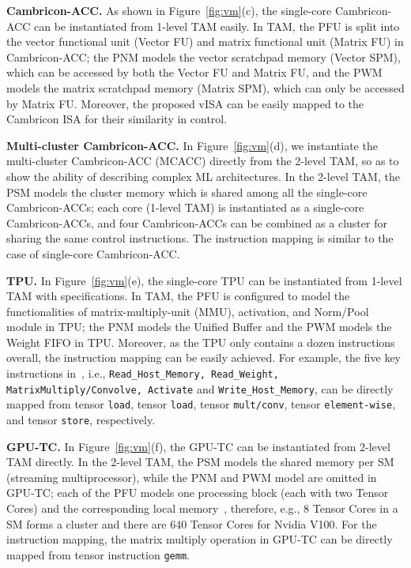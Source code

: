 \textbf{Cambricon-ACC.} As shown in Figure~\ref{fig:vm}(c), the
single-core Cambricon-ACC can be instantiated from 1-level TAM easily. In TAM,
the PFU is split into the vector functional unit (Vector FU) and matrix
functional unit (Matrix FU) in Cambricon-ACC; the PNM models the vector
scratchpad memory (Vector SPM), which can be accessed by both the Vector FU and
Matrix FU, and the PWM models the matrix scratchpad memory (Matrix SPM), which
can only be accessed by Matrix FU. Moreover, the proposed vISA can be
easily mapped to the Cambricon ISA for their similarity in control.

\textbf{Multi-cluster Cambricon-ACC.}
In Figure~\ref{fig:vm}(d), we instantiate the multi-cluster Cambricon-ACC (MCACC)
directly from the 2-level TAM, so as to show the ability of describing complex
ML architectures. In the 2-level TAM, the PSM models the cluster memory which is
shared among all the single-core Cambricon-ACCs; each core (1-level TAM) is
instantiated as a single-core Cambricon-ACCs, and four Cambricon-ACCs can be
combined as a cluster for sharing the same control instructions. The
instruction mapping is similar to the case of single-core Cambricon-ACC.

\textbf{TPU.} In Figure~\ref{fig:vm}(e), the single-core TPU
can be instantiated from 1-level TAM with specifications. In TAM, the PFU
is configured to model the functionalities of matrix-multiply-unit (MMU), activation, and
Norm/Pool module in TPU; the PNM models the Unified Buffer and the PWM models
the Weight FIFO in TPU. Moreover, as the TPU only contains a dozen
instructions overall, the instruction mapping can be easily achieved. For
example, the five key instructions in~\cite{jouppi2017datacenter}, i.e., \texttt{Read\_Host\_Memory,
Read\_Weight, MatrixMultiply/Convolve, Activate} and \texttt{Write\_Host\_Memory},
can be directly mapped from tensor \texttt{load}, tensor \texttt{load}, tensor
\texttt{mult/conv}, tensor \texttt{element-wise}, and tensor \texttt{store}, respectively.

\textbf{GPU-TC.} In Figure~\ref{fig:vm}(f), the GPU-TC can be
instantiated from 2-level TAM directly. In the 2-level TAM, the PSM models the 
shared memory per SM (streaming multiprocessor), while the PNM and PWM model are omitted in GPU-TC; 
each of the PFU models one processing block (each with two Tensor Cores) and the corresponding local memory~\cite{V100}, 
therefore, e.g., 8 Tensor Cores in a SM forms a cluster and there are 640 Tensor Cores for Nvidia
V100. For the instruction mapping, the matrix multiply operation in GPU-TC can
be directly mapped from tensor instruction \texttt{gemm}.



